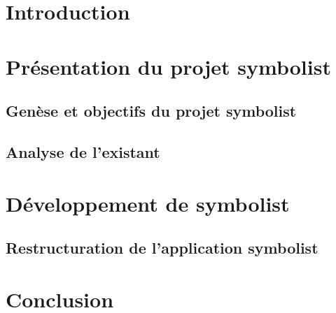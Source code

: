 \documentclass[a4paper, oneside]{book}
\theoremstyle{definition}
\begin{document}



\setcounter{tocdepth}{1} %

\tableofcontents
\clearpage

\chapter{Introduction}



\chapter{Présentation du projet symbolist}
\label{chap:presentationSymbolist}
	
\section{Genèse et objectifs du projet symbolist}
\label{sec:geneseSymbolist}
	

\section{Analyse de l'existant}
\label{sec:analyseSymbolist}


\chapter{Développement de symbolist}
\label{chap:devSymbolist}

\section{Restructuration de l'application symbolist}
\label{sec:restructurationSymbolist}

	
\clearpage
\chapter{Conclusion}

\end{document}

